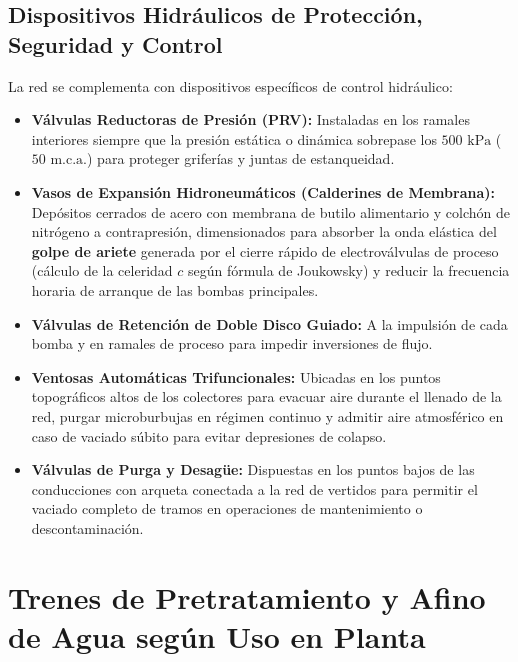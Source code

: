 \documentclass{report}
\begin{document}
\subsection{Dispositivos Hidráulicos de Protección, Seguridad y Control}

La red se complementa con dispositivos específicos de control hidráulico:
\begin{itemize}
    \item \textbf{Válvulas Reductoras de Presión (PRV):} Instaladas en los ramales interiores siempre que la presión estática o dinámica sobrepase los $500\text{ kPa}$ ($50\text{ m.c.a.}$) para proteger griferías y juntas de estanqueidad.
    \item \textbf{Vasos de Expansión Hidroneumáticos (Calderines de Membrana):} Depósitos cerrados de acero con membrana de butilo alimentario y colchón de nitrógeno a contrapresión, dimensionados para absorber la onda elástica del \textbf{golpe de ariete} generada por el cierre rápido de electroválvulas de proceso (cálculo de la celeridad $c$ según fórmula de Joukowsky) y reducir la frecuencia horaria de arranque de las bombas principales.
    \item \textbf{Válvulas de Retención de Doble Disco Guiado:} A la impulsión de cada bomba y en ramales de proceso para impedir inversiones de flujo.
    \item \textbf{Ventosas Automáticas Trifuncionales:} Ubicadas en los puntos topográficos altos de los colectores para evacuar aire durante el llenado de la red, purgar microburbujas en régimen continuo y admitir aire atmosférico en caso de vaciado súbito para evitar depresiones de colapso.
    \item \textbf{Válvulas de Purga y Desagüe:} Dispuestas en los puntos bajos de las conducciones con arqueta conectada a la red de vertidos para permitir el vaciado completo de tramos en operaciones de mantenimiento o descontaminación.
\end{itemize}

\section{Trenes de Pretratamiento y Afino de Agua según Uso en Planta}
\end{document}
